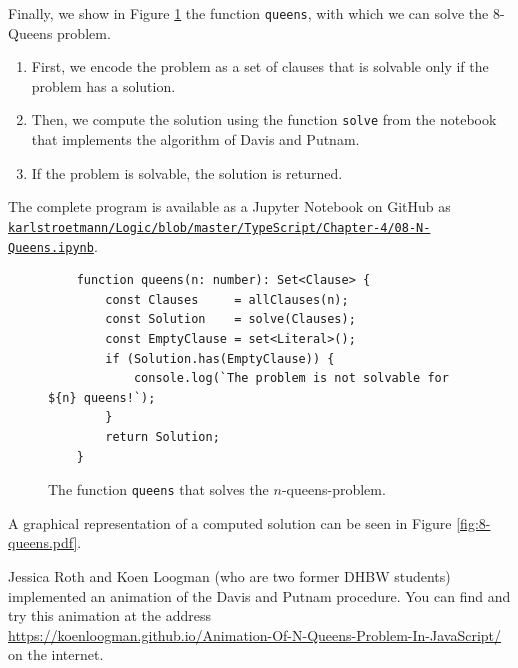 Finally, we show in Figure \ref{fig:solve:queens} the function
\texttt{queens}, with which we can solve the 8-Queens problem.
\begin{enumerate}
\item First, we encode the problem as a set of clauses that is solvable
      only if the problem has a solution.
\item Then, we compute the solution using the function \texttt{solve} from the notebook
      that implements the algorithm of Davis and Putnam.
\item If the problem is solvable, the solution is returned.
\end{enumerate}
The complete program is available as a Jupyter Notebook on GitHub as
\\[0.2cm]
\hspace*{1.3cm}
\href{https://github.com/karlstroetmann/Logic/blob/master/TypeScript/Chapter-4/08-N-Queens.ipynb}{\texttt{karlstroetmann/Logic/blob/master/TypeScript/Chapter-4/08-N-Queens.ipynb}}.




\begin{figure}[!ht]
\centering
\begin{verbatim}
    function queens(n: number): Set<Clause> {
        const Clauses     = allClauses(n);
        const Solution    = solve(Clauses);
        const EmptyClause = set<Literal>();
        if (Solution.has(EmptyClause)) {
            console.log(`The problem is not solvable for ${n} queens!`); 
        }
        return Solution;
    }
\end{verbatim} 
\vspace*{-0.3cm}
\caption{The function \texttt{queens} that solves the $n$-queens-problem.}
\label{fig:solve:queens}
\end{figure} %

A graphical representation of a computed solution can be seen in Figure \ref{fig:8-queens.pdf}.


Jessica Roth and Koen Loogman (who are two former DHBW students) implemented an animation of the Davis and Putnam procedure. You can find and try this animation at the address
\\[0.2cm]
\hspace*{1.3cm}
\href{https://koenloogman.github.io/Animation-Of-N-Queens-Problem-In-JavaScript/}{https://koenloogman.github.io/Animation-Of-N-Queens-Problem-In-JavaScript/}
\\[0.2cm]
on the internet.

